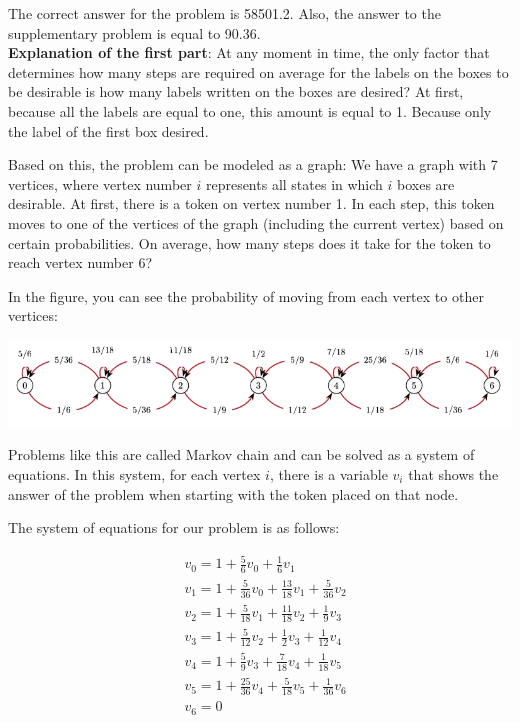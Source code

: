 \begin{solution}
The correct answer for the problem is 58501.2. Also, the answer to the supplementary problem is equal to 90.36.\\[0.2cm]

\textbf{Explanation of the first part}: At any moment in time, the only factor that determines how many steps are required on average for the labels on the boxes to be desirable is how many labels written on the boxes are desired? At first, because all the labels are equal to one, this amount is equal to 1. Because  only the label of the first box desired.

Based on this, the problem can be modeled as a graph:
We have a graph with 7 vertices, where vertex number $i$ represents all states in which $i$ boxes are desirable. At first, there is a token on vertex number  1. In each step, this token moves to one of the vertices of the graph (including the current vertex) based on certain probabilities. On average, how many steps does it take for the token to reach vertex number 6?

In the figure, you can see the probability of moving from each vertex to other vertices:

\begin{center}
	\includegraphics{24/figs/24_diagram1.png}
\end{center}

Problems like this are called Markov chain and can be solved as a system of equations. In this system, for each vertex $i$, there is a variable $v_i$ that shows the answer of the problem when starting with the token placed on that node.

The system of equations for our problem is as follows:

$$
\begin{aligned}
&v_0 = 1 + \frac{5}{6}v_0 + \frac{1}{6}v_1 \\
&v_1 = 1 + \frac{5}{36}v_0 + \frac{13}{18}v_1 + \frac{5}{36}v_2 \\
&v_2 = 1 + \frac{5}{18}v_1 + \frac{11}{18}v_2 + \frac{1}{9}v_3 \\
&v_3 = 1 + \frac{5}{12}v_2 + \frac{1}{2}v_3 + \frac{1}{12}v_4 \\
&v_4 = 1 + \frac{5}{9}v_3 + \frac{7}{18}v_4 + \frac{1}{18}v_5 \\
&v_5 = 1 + \frac{25}{36}v_4 + \frac{5}{18}v_5 + \frac{1}{36}v_6 \\
&v_6 = 0
\end{aligned}
$$


\end{solution}
